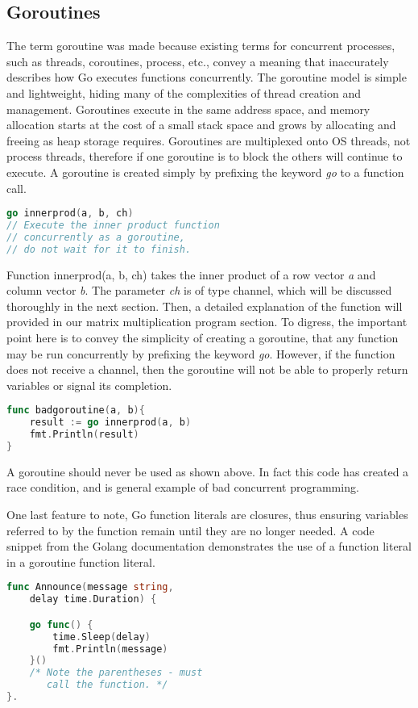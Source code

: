 \subsection{Goroutines}
	The term goroutine was made because existing terms for concurrent processes, such as threads, coroutines, process, etc., convey a meaning that inaccurately describes how Go executes functions concurrently. The goroutine model is simple and lightweight, hiding many of the complexities of thread creation and management. Goroutines execute in the same address space, and memory allocation starts at the cost of a small stack space and grows by allocating and freeing as heap storage requires. Goroutines are multiplexed onto OS threads, not process threads, therefore if one goroutine is to block the others will continue to execute.\cite{website:go-lang-documentation}
	A goroutine is created simply by prefixing the keyword \emph{go} to a function call.	
\begin{lstlisting}[language=Go]
go innerprod(a, b, ch) 
// Execute the inner product function
// concurrently as a goroutine,
// do not wait for it to finish.
\end{lstlisting}
Function innerprod(a, b, ch) takes the inner product of a row vector \emph{a} and column vector \emph{b}. The parameter \emph{ch} is of type channel, which will be discussed thoroughly in the next section. Then, a detailed explanation of the function will provided in our matrix multiplication program section. To digress, the important point here is to convey the simplicity of creating a goroutine, that any function may be run concurrently by prefixing the keyword \emph{go}. However, if the function does not receive a channel, then the goroutine will not be able to properly return variables or signal its completion.
\begin{lstlisting}[language=Go]
func badgoroutine(a, b){
	result := go innerprod(a, b)
	fmt.Println(result)
}
\end{lstlisting}
A goroutine should never be used as shown above. In fact this code has created a race condition, and is general example of bad concurrent programming.

One last feature to note, Go function literals are closures, thus ensuring variables referred to by the function remain until they are no longer needed. A code snippet from the Golang documentation demonstrates the use of a function literal in a goroutine function literal.
\begin{lstlisting}[language=Go]
func Announce(message string, 
	delay time.Duration) {

    go func() {
        time.Sleep(delay)
        fmt.Println(message)
    }()  
    /* Note the parentheses - must
       call the function. */
}.
\end{lstlisting}
